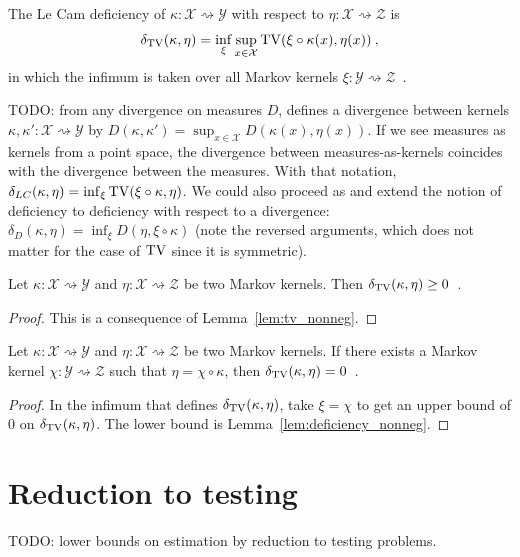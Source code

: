 \begin{definition}
  \label{def:deficiency}
  The Le Cam deficiency of $\kappa : \mathcal X \rightsquigarrow \mathcal Y$ with respect to $\eta : \mathcal X \rightsquigarrow \mathcal Z$ is
  \begin{align*}
  \delta_{\operatorname{TV}}(\kappa, \eta) = \inf_{\xi} \sup_{x \in \mathcal X} \operatorname{TV}(\xi \circ \kappa (x), \eta(x)) \: ,
  \end{align*}
  in which the infimum is taken over all Markov kernels $\xi : \mathcal Y \rightsquigarrow \mathcal Z$~.
\end{definition}

TODO: from any divergence on measures $D$, \cite{perrone2023markov} defines a divergence between kernels $\kappa, \kappa' : \mathcal X \rightsquigarrow \mathcal Y$ by $D(\kappa, \kappa') = \sup_{x \in \mathcal X} D(\kappa(x), \eta(x))$.
If we see measures as kernels from a point space, the divergence between measures-as-kernels coincides with the divergence between the measures.
With that notation, $\delta_{LC}(\kappa, \eta) = \inf_{\xi} \operatorname{TV}(\xi \circ \kappa, \eta)$.
We could also proceed as \cite{raginsky2011shannon} and extend the notion of deficiency to deficiency with respect to a divergence: $\delta_D(\kappa, \eta) = \inf_{\xi} D(\eta, \xi\circ\kappa)$ (note the reversed arguments, which does not matter for the case of $\operatorname{TV}$ since it is symmetric).

\begin{lemma}
  \label{lem:deficiency_nonneg}
  Let $\kappa: \mathcal X \rightsquigarrow \mathcal Y$ and $\eta : \mathcal X \rightsquigarrow \mathcal Z$ be two Markov kernels. Then $\delta_{\operatorname{TV}}(\kappa, \eta) \ge 0$~.
\end{lemma}

\begin{proof}%
{}
This is a consequence of Lemma~\ref{lem:tv_nonneg}.
\end{proof}

\begin{lemma}
  \label{lem:deficiency_comp}
  Let $\kappa: \mathcal X \rightsquigarrow \mathcal Y$ and $\eta : \mathcal X \rightsquigarrow \mathcal Z$ be two Markov kernels. If there exists a Markov kernel $\chi : \mathcal Y \rightsquigarrow \mathcal Z$ such that $\eta = \chi \circ \kappa$, then $\delta_{\operatorname{TV}}(\kappa, \eta) = 0$~.
\end{lemma}

\begin{proof}%
\uses{}
In the infimum that defines $\delta_{\operatorname{TV}}(\kappa, \eta)$, take $\xi = \chi$ to get an upper bound of 0 on $\delta_{\operatorname{TV}}(\kappa, \eta)$. The lower bound is Lemma~\ref{lem:deficiency_nonneg}.
\end{proof}



\section{Reduction to testing}

TODO: lower bounds on estimation by reduction to testing problems.
